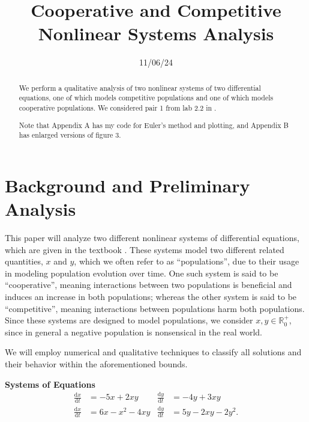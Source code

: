 \documentclass[11pt, letterpaper]{article}
\title{Cooperative and Competitive Nonlinear Systems Analysis}
\date{11/06/24}
\begin{document}
\maketitle
\doublespacing
\begin{abstract}
	We perform a qualitative analysis of two nonlinear systems of two differential equations, one of which models competitive populations and one of which models cooperative populations. We considered pair 1 from lab 2.2 in \cite{textbook}.

	Note that Appendix A has my code for Euler's method and plotting, and Appendix B has enlarged versions of figure 3.
\end{abstract}
\section{Background and Preliminary Analysis}\label{sec:1}
This paper will analyze two different nonlinear systems of differential equations, which are given in the textbook \cite{textbook}. These systems model two different related quantities, $x$ and $y$, which we often refer to as ``populations'', due to their usage in modeling population evolution over time. One such system is said to be ``cooperative'', meaning interactions between two populations is beneficial and induces an increase in both populations; whereas the other system is said to be ``competitive'', meaning interactions between populations harm both populations. Since these systems are designed to model populations, we consider $x,y\in\mathbb{R}_0^+$, since in general a negative population is nonsensical in the real world.

We will employ numerical and qualitative techniques to classify all solutions and their behavior within the aforementioned bounds.

\renewcommand{\theequation}{\Alph{equation}}
\begin{mdframed}
	\begin{center}
		\textbf{Systems of Equations}
		\begin{align}\label{sys}
			\frac{\mathrm{d}x}{\mathrm{d}t} &=-5x+2xy&\frac{\mathrm{d}y}{\mathrm{d}t} &=-4y+3xy\\
			\frac{\mathrm{d}x}{\mathrm{d}t} &=6x-x^2-4xy&\frac{\mathrm{d}y}{\mathrm{d}t} &=5y-2xy-2y^2.
		\end{align}
	\end{center}
\end{mdframed}
\renewcommand{\theequation}{\arabic{equation}}
\setcounter{equation}{0}
\end{document}

